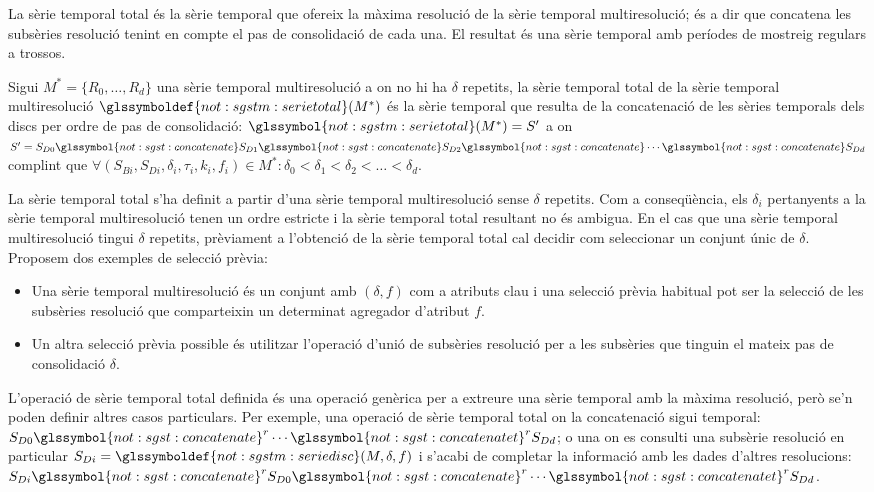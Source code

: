 La sèrie temporal total és la sèrie temporal que ofereix la màxima
resolució de la sèrie temporal multiresolució; és a dir que concatena
les subsèries resolució tenint en compte el pas de consolidació de
cada una. El resultat és una sèrie temporal amb períodes de mostreig
regulars a trossos.
\begin{definition}
  \label{def:sgstm:total}
  Sigui $M^*=\{R_0,\dotsc,R_{d}\}$ una sèrie temporal multiresolució a
  on no hi ha $\delta$ repetits, la sèrie temporal total de la sèrie
  temporal multiresolució $\glssymboldef{not:sgstm:serietotal}(M^*)$
  és la sèrie temporal que resulta de la concatenació de les sèries
  temporals dels discs per ordre de pas de consolidació:
  $\glssymbol{not:sgstm:serietotal}(M^*)=S'$ a on $S'= S_{D0}
  \glssymbol{not:sgst:concatenate} S_{D1} \glssymbol{not:sgst:concatenate} S_{D2} \glssymbol{not:sgst:concatenate} \dotsb \glssymbol{not:sgst:concatenate}
  S_{Dd}$ complint que $\forall
  (S_{Bi},S_{Di},\delta_i,\tau_i,k_i,f_i) \in M^* : \delta_0 <
  \delta_1 < \delta_2 < \dots < \delta_d$.
\end{definition}

La sèrie temporal total s'ha definit a partir d'una sèrie temporal
multiresolució sense $\delta$ repetits. Com a conseqüència, els
$\delta_i$ pertanyents a la sèrie temporal multiresolució tenen un
ordre estricte i la sèrie temporal total resultant no és ambigua.
En el cas que una sèrie temporal multiresolució tingui $\delta$
repetits, prèviament a l'obtenció de la sèrie temporal total cal
decidir com seleccionar un conjunt únic de $\delta$. Proposem dos
exemples de selecció prèvia:
\begin{itemize}
\item Una sèrie temporal multiresolució és un conjunt amb $(\delta,f)$
  com a atributs clau i una selecció prèvia habitual pot ser la
  selecció de les subsèries resolució que comparteixin un determinat
  agregador d'atribut $f$.
\item Un altra selecció prèvia possible és utilitzar l'operació d'unió
  de subsèries resolució per a les subsèries que tinguin el mateix pas
  de consolidació $\delta$.
\end{itemize}



L'operació de sèrie temporal total definida és una operació genèrica
per a extreure una sèrie temporal amb la màxima resolució, però se'n
poden definir altres casos particulars. Per exemple, una operació de
sèrie temporal total on la concatenació sigui temporal: $S_{D0}
\glssymbol{not:sgst:concatenate}^r \dotsb
\glssymbol{not:sgst:concatenatet}^r S_{Dd}$; o una on es consulti una
subsèrie resolució en particular
$S_{Di}=\glssymboldef{not:sgstm:seriedisc}(M,\delta,f)$ i s'acabi de
completar la informació amb les dades d'altres resolucions: $S_{Di}
\glssymbol{not:sgst:concatenate}^r S_{D0}
\glssymbol{not:sgst:concatenate}^r \dotsb
\glssymbol{not:sgst:concatenatet}^r S_{Dd}$.


